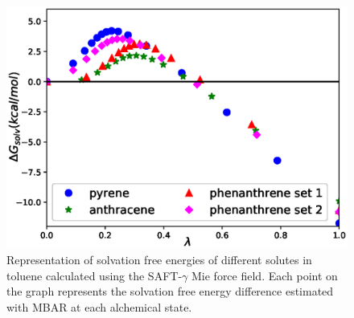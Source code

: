 \documentclass[preprint]{elsarticle}
\begin{document}
	\begin{figure}
		\centering
		\includegraphics[width=1.0\linewidth]{Figures/tolartsets.eps}
		\caption{Representation of solvation free energies of different solutes in toluene calculated using the SAFT-$\gamma$ Mie force field. Each point on the graph represents the solvation free energy difference estimated with MBAR at each alchemical state. }
		\label{fig:tol}
	\end{figure}
	
\end{document}
